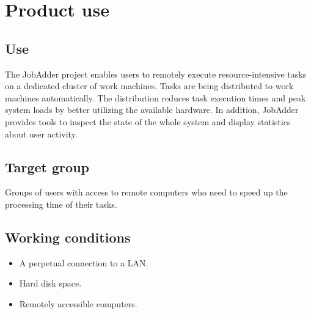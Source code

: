 \section{Product use}
\subsection{Use}
The JobAdder project enables users to remotely execute resource-intensive tasks on a dedicated cluster of work machines.
Tasks are being distributed to work machines automatically.
The distribution reduces task execution times and peak system loads by better utilizing the available hardware.
In addition, JobAdder provides tools to inspect the state of the whole system and display statistics about user activity.

\subsection{Target group}
Groups of users with access to remote computers who need to speed up the processing time of their tasks.

\subsection{Working conditions}
\begin{itemize}
\item A perpetual connection to a LAN.
\item Hard disk space.
\item Remotely accessible computers.
\end{itemize}